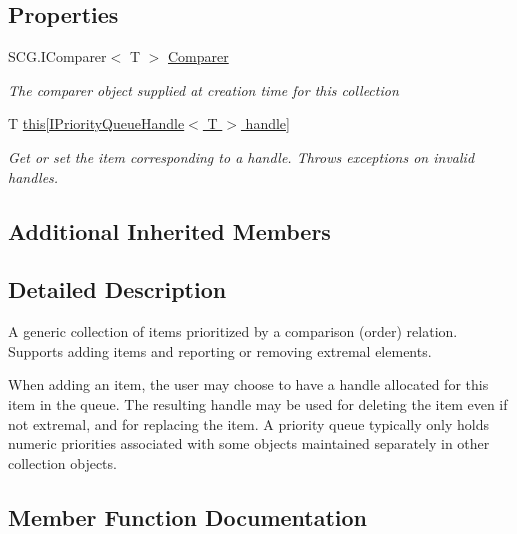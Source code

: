 \subsection*{Properties}
\begin{DoxyCompactItemize}
\item 
S\+C\+G.\+I\+Comparer$<$ T $>$ \hyperlink{interface_c5_1_1_i_priority_queue_a23bf42fafa0689dca8f95d1ad7ee0b28}{Comparer}
\begin{DoxyCompactList}\small\item\em The comparer object supplied at creation time for this collection \end{DoxyCompactList}\item 
T \hyperlink{interface_c5_1_1_i_priority_queue_a39daad6dcf3a45c1241d4d776d18bed9}{this\mbox{[}\+I\+Priority\+Queue\+Handle$<$ T $>$ handle\mbox{]}}
\begin{DoxyCompactList}\small\item\em Get or set the item corresponding to a handle. Throws exceptions on invalid handles. \end{DoxyCompactList}\end{DoxyCompactItemize}
\subsection*{Additional Inherited Members}


\subsection{Detailed Description}
A generic collection of items prioritized by a comparison (order) relation. Supports adding items and reporting or removing extremal elements. 

When adding an item, the user may choose to have a handle allocated for this item in the queue. The resulting handle may be used for deleting the item even if not extremal, and for replacing the item. A priority queue typically only holds numeric priorities associated with some objects maintained separately in other collection objects. 

\subsection{Member Function Documentation}
\hypertarget{interface_c5_1_1_i_priority_queue_ac90f40246d54cb28935bf89d9e0c9c72}{}
